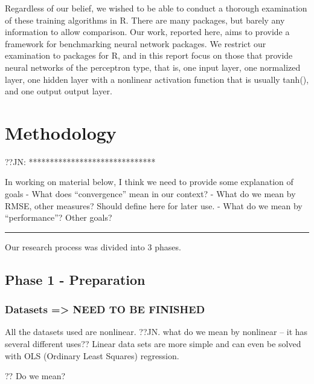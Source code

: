 Regardless of our belief, we wished to be able to conduct a thorough
examination of these training algorithms in R. There are many packages,
but barely any information to allow comparison. Our work, reported here,
aims to provide a framework for benchmarking neural network packages. We
restrict our examination to packages for R, and in this report focus on
those that provide neural networks of the perceptron type, that is, one
input layer, one normalized layer, one hidden layer with a nonlinear
activation function that is usually tanh(), and one output output layer.

\hypertarget{methodology}{%
\section{Methodology}\label{methodology}}

??JN: ******************************

In working on material below, I think we need to provide some
explanation of goals - What does ``convergence'' mean in our context? -
What do we mean by RMSE, other measures? Should define here for later
use. - What do we mean by ``performance''? Other goals?

\begin{center}\rule{0.5\linewidth}{0.5pt}\end{center}

Our research process was divided into 3 phases.

\hypertarget{phase-1---preparation}{%
\subsection{Phase 1 - Preparation}\label{phase-1---preparation}}

\hypertarget{datasets-need-to-be-finished}{%
\subsubsection{Datasets =\textgreater{} NEED TO BE
FINISHED}\label{datasets-need-to-be-finished}}

All the datasets used are nonlinear. ??JN. what do we mean by nonlinear
-- it has several different uses?? Linear data sets are more simple and
can even be solved with OLS (Ordinary Least Squares) regression.

?? Do we mean?

